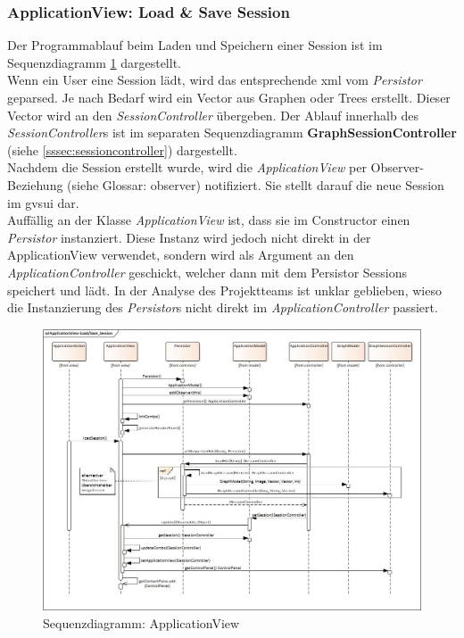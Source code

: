 \documentclass[11pt,a4paper,english,oneside]{book}
\numberwithin{equation}{chapter}
\begin{document}
	\subsubsection{ApplicationView: Load \& Save Session} \label{sssec:appView}
	Der Programmablauf beim Laden und Speichern einer Session ist im Sequenzdiagramm \ref{fig:sd-applicationview} dargestellt. \\
	Wenn ein User eine Session lädt, wird das entsprechende \gls{xml} vom \textit{Persistor} geparsed. Je nach Bedarf wird ein Vector aus Graphen oder Trees erstellt. Dieser Vector wird an den \textit{SessionController} übergeben. Der Ablauf innerhalb des \textit{SessionController}s ist im separaten Sequenzdiagramm \textbf{GraphSessionController} (siehe \ref{sssec:sessioncontroller}) dargestellt. \\
	Nachdem die Session erstellt wurde, wird die \textit{ApplicationView} per Observer-Beziehung (siehe Glossar: \gls{observer}) notifiziert. Sie stellt darauf die neue Session im \gls{gvsui} dar.\\
	Auffällig an der Klasse \textit{ApplicationView} ist, dass sie im Constructor einen \textit{Persistor} instanziert. Diese Instanz wird jedoch nicht direkt in der ApplicationView verwendet, sondern wird als Argument an den \textit{ApplicationController} geschickt, welcher dann mit dem Persistor Sessions speichert und lädt. In der Analyse des Projektteams ist unklar geblieben, wieso die Instanzierung des \textit{Persistor}s nicht direkt im \textit{ApplicationController} passiert.
	\begin{figure}[h!]
		\centering
		\includegraphics[width=\linewidth]{assets/images/application_view}
		\caption{Sequenzdiagramm: ApplicationView}
		\label{fig:sd-applicationview}
	\end{figure}
\end{document}
